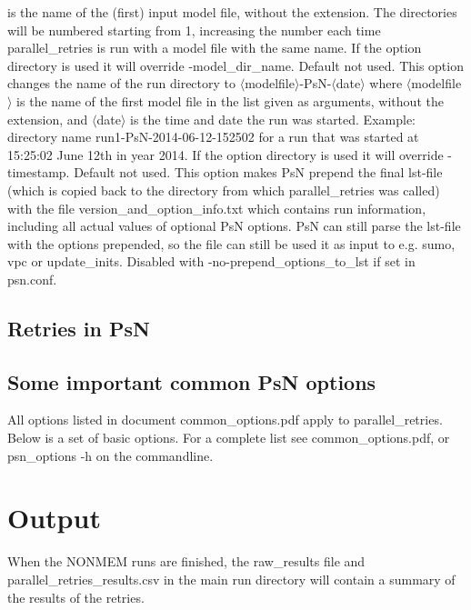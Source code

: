 \begin{optionlist}
is the name of the (first) input model file, without the extension. 
The directories will be numbered starting from 1, increasing the number each time parallel\_retries 
is run with a model file with the 
same name. If the option directory is used it will override -model\_dir\_name.
\nextopt
{}
Default not used. This option changes the name of the run directory to $\langle$modelfile$\rangle$-PsN-$\langle$date$\rangle$
where $\langle$modelfile$\rangle$ is the name of the first model file in the list given as arguments, without the extension,
and $\langle$date$\rangle$ is the time and date the run was started. 
Example: directory name run1-PsN-2014-06-12-152502 for a run that was started at 15:25:02 June 12th in year 2014.
If the option directory is used it will override -timestamp.
\nextopt
{}
Default not used. This option makes PsN prepend the final lst-file (which is copied back to the directory from which parallel\_retries was called) with the file version\_and\_option\_info.txt which contains run information, including     all actual values of optional PsN options. PsN can still parse the lst-file with the options prepended, so the file can still be used it as input to e.g. sumo, vpc or update\_inits. Disabled with -no-prepend\_options\_to\_lst if set in psn.conf.
\nextopt
\end{optionlist}

\subsection{Retries in PsN}


\subsection{Some important common PsN options}
All options listed in document common\_options.pdf apply to parallel\_retries. 
Below is a set of basic options. For a complete list see common\_options.pdf, 
or psn\_options -h on the commandline.


\section{Output}
When the NONMEM runs are finished, the raw\_results file 
and parallel\_retries\_results.csv
in the
main run directory will contain a summary of the results of the 
retries.


